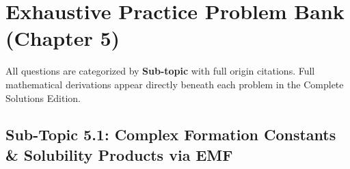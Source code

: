 \newpage
\section{Exhaustive Practice Problem Bank (Chapter 5)}
\label{sec:ch05_problem_bank}

\begin{tcolorbox}[enhanced,colback=subtlegreen,colframe=cengagegreen,arc=2mm,boxrule=1pt,title=\textbf{\large Organization of Practice Problems}]
All questions are categorized by \textbf{Sub-topic} with full origin citations. Full mathematical derivations appear directly beneath each problem in the Complete Solutions Edition.
\end{tcolorbox}

\subsection{Sub-Topic 5.1: Complex Formation Constants \& Solubility Products via EMF}

